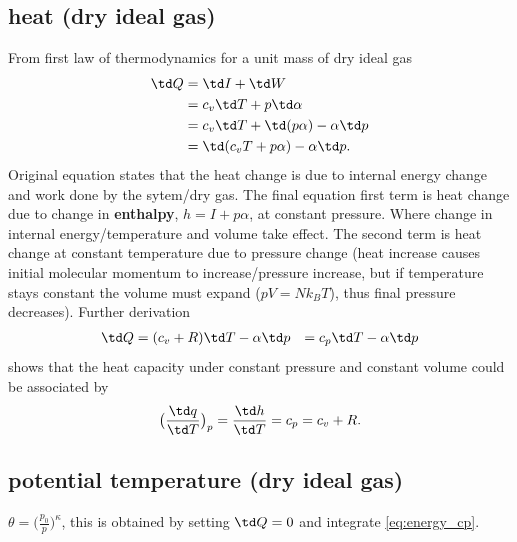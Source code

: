 \subsection{heat (dry ideal gas)}
\begin{derv*} 
From first law of thermodynamics for a unit mass of dry ideal gas
\begin{equation} \label{eq:energy_cv}
\begin{aligned}
  \td Q & = \td I + \td W \\
        & = c_v \td T + p \td \alpha \\
        & = c_v \td T + \td(p\alpha) - \alpha \td p \\
        & = \td (c_v T + p\alpha) - \alpha \td p. 
\end{aligned}
\end{equation}
Original equation states that the heat change is due to internal energy change and work done by the
sytem/dry gas. The final equation first term is heat change due to change in {\bf{enthalpy}}, $h = I
+ p\alpha$, at constant pressure. Where change in internal energy/temperature and volume take
effect. The second term is heat change at constant temperature due to pressure change (heat increase
causes initial molecular momentum to increase/pressure increase, but if temperature stays constant
the volume must expand ($pV=Nk_BT$), thus final pressure decreases). Further derivation 
\begin{equation} \label{eq:energy_cp}
\begin{aligned}
  \td Q & = (c_v + R) \td T - \alpha \td p
        & = c_p \td T - \alpha \td p
\end{aligned}
\end{equation}
shows that the heat capacity under constant pressure and constant volume could be associated by
\begin{equation}
  \big( \frac{\td q}{\td T} \big)_p = \frac{\td h}{\td T} =  c_p = c_v + R.
\end{equation}
\end{derv*}

\subsection{potential temperature (dry ideal gas)}
\begin{defn*} $\theta = \big(\frac{p_0}{p}\big)^\kappa$, this is obtained by setting $\td Q=0$
and integrate \eqref{eq:energy_cp}. 
\end{defn*}

